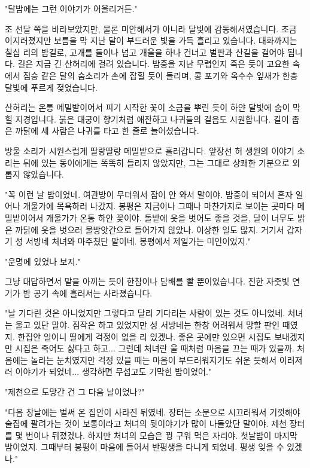 \documentclass[fs85,seriesRus]{korfarm-base}
\begin{document}
{"달밤에는 그런 이야기가 어울리거든."

조 선달 쪽을 바라보았지만, 물론 미안해서가 아니라 달빛에 감동해서였습니다. 조금 이지러졌지만 보름을 막 지난 달이 부드러운 빛을 가득 흘리고 있습니다. 대화까지는 칠십 리의 밤길로, 고개를 둘이나 넘고 개울을 하나 건너고 벌판과 산길을 걸어야 됩니다. 길은 지금 긴 산허리에 걸려 있습니다. 밤중을 지난 무렵인지 죽은 듯이 고요한 속에서 짐승 같은 달의 숨소리가 손에 잡힐 듯이 들리며, 콩 포기와 옥수수 잎새가 한층 달빛에 푸르게 젖었습니다.

산허리는 온통 메밀밭이어서 피기 시작한 꽃이 소금을 뿌린 듯이 하얀 달빛에 숨이 막힐 지경입니다. 붉은 대궁이 향기처럼 애잔하고 나귀들의 걸음도 시원합니다. 길이 좁은 까닭에 세 사람은 나귀를 타고 한 줄로 늘어섰습니다.

방울 소리가 시원스럽게 딸랑딸랑 메밀밭으로 흘러갑니다. 앞장선 허 생원의 이야기 소리는 뒤에 있는 동이에게는 똑똑히 들리지 않았지만, 그는 그대로 상쾌한 기분으로 외롭지 않았습니다.

"꼭 이런 날 밤이었네. 여관방이 무더워서 잠이 안 와서 말이야. 밤중이 되어서 혼자 일어나 개울가에 목욕하러 나갔지. 봉평은 지금이나 그때나 마찬가지로 보이는 곳마다 메밀밭이어서 개울가가 온통 하얀 꽃이야. 돌밭에 옷을 벗어도 좋을 것을, 달이 너무도 밝은 까닭에 옷을 벗으러 물방앗간으로 들어가지 않았나. 이상한 일도 많지. 거기서 갑자기 성 서방네 처녀와 마주쳤단 말이네. 봉평에서 제일가는 미인이었지."

"운명에 있었나 보지."

그냥 대답하면서 말을 아끼는 듯이 한참이나 담배를 빨 뿐이었습니다. 진한 자줏빛 연기가 밤 공기 속에 흘러서는 사라졌습니다.

"날 기다린 것은 아니었지만 그렇다고 달리 기다리는 사람이 있는 것도 아니었네. 처녀는 울고 있단 말야. 짐작은 하고 있었지만 성 서방네는 한창 어려워서 망할 판인 때였지. 한집안 일이니 딸에게 걱정이 없을 리 있겠나. 좋은 곳에만 있으면 시집도 보내겠지만 시집은 죽어도 싫다고 하고... 그런데 처녀란 울 때처럼 마음을 끄는 때가 있을까. 처음에는 놀라는 눈치였지만 걱정 있을 때는 마음이 부드러워지기도 쉬운 듯해서 이러저러 이야기가 되었네... 생각하면 무섭고도 기막힌 밤이었어."

"제천으로 도망간 건 그 다음 날이었나?"

"다음 장날에는 벌써 온 집안이 사라진 뒤였네. 장터는 소문으로 시끄러워서 기껏해야 술집에 팔려가는 것이 보통이라고 처녀의 뒷이야기가 많이 나돌았단 말이야. 제천 장터를 몇 번이나 뒤졌겠나. 하지만 처녀의 모습은 꿩 구워 먹은 자리야. 첫날밤이 마지막 밤이었지. 그때부터 봉평이 마음에 들어서 반평생을 다니게 되었네. 평생 잊을 수 있겠나."

}
\end{document}
